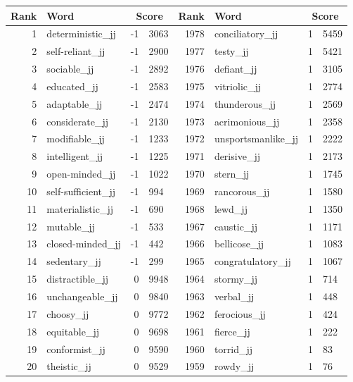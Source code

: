 \begin{table}[tbp]
    \begin{tabular}{| rlr@{.}l | rlr@{.}l |}
    \hline
    \textbf{Rank} & \textbf{Word} & \multicolumn{2}{c|}{\textbf{Score}} & \textbf{Rank} & \textbf{Word} & \multicolumn{2}{c|}{\textbf{Score}} \\
    \hline
    1 & deterministic\_jj & -1 & 3063    &    1978 & conciliatory\_jj & 1 & 5459 \\
    2 & self-reliant\_jj & -1 & 2900    &    1977 & testy\_jj & 1 & 5421 \\
    3 & sociable\_jj & -1 & 2892    &    1976 & defiant\_jj & 1 & 3105 \\
    4 & educated\_jj & -1 & 2583    &    1975 & vitriolic\_jj & 1 & 2774 \\
    5 & adaptable\_jj & -1 & 2474    &    1974 & thunderous\_jj & 1 & 2569 \\
    6 & considerate\_jj & -1 & 2130    &    1973 & acrimonious\_jj & 1 & 2358 \\
    7 & modifiable\_jj & -1 & 1233    &    1972 & unsportsmanlike\_jj & 1 & 2222 \\
    8 & intelligent\_jj & -1 & 1225    &    1971 & derisive\_jj & 1 & 2173 \\
    9 & open-minded\_jj & -1 & 1022    &    1970 & stern\_jj & 1 & 1745 \\
    10 & self-sufficient\_jj & -1 & 994    &    1969 & rancorous\_jj & 1 & 1580 \\
    11 & materialistic\_jj & -1 & 690    &    1968 & lewd\_jj & 1 & 1350 \\
    12 & mutable\_jj & -1 & 533    &    1967 & caustic\_jj & 1 & 1171 \\
    13 & closed-minded\_jj & -1 & 442    &    1966 & bellicose\_jj & 1 & 1083 \\
    14 & sedentary\_jj & -1 & 299    &    1965 & congratulatory\_jj & 1 & 1067 \\
    15 & distractible\_jj & 0 & 9948    &    1964 & stormy\_jj & 1 & 714 \\
    16 & unchangeable\_jj & 0 & 9840    &    1963 & verbal\_jj & 1 & 448 \\
    17 & choosy\_jj & 0 & 9772    &    1962 & ferocious\_jj & 1 & 424 \\
    18 & equitable\_jj & 0 & 9698    &    1961 & fierce\_jj & 1 & 222 \\
    19 & conformist\_jj & 0 & 9590    &    1960 & torrid\_jj & 1 & 83 \\
    20 & theistic\_jj & 0 & 9529    &    1959 & rowdy\_jj & 1 & 76 \\

\end{tabular}
\end{table}
